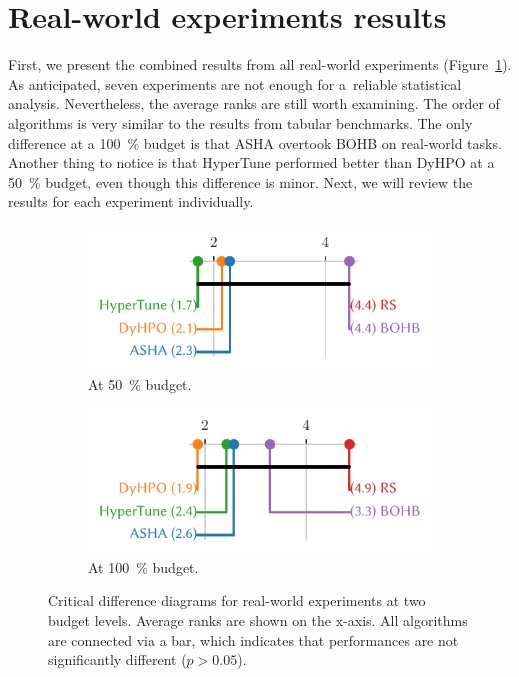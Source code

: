 \section{Real-world experiments results}

First, we present the combined results from all real-world experiments (Figure~\ref{fig:real_combined}). As anticipated, seven experiments are not enough for a~reliable statistical analysis. Nevertheless, the average ranks are still worth examining. The order of algorithms is very similar to the results from tabular benchmarks. The only difference at a \SI{100}{\percent} budget is that ASHA overtook BOHB on real-world tasks. Another thing to notice is that HyperTune performed better than DyHPO at a \SI{50}{\percent} budget, even though this difference is minor. Next, we will review the results for each experiment individually.


\begin{figure}[H]
    \begin{subfigure}{.5\textwidth}
        \includegraphics[width=.92\textwidth]{img/real_exp/cd_diagram_real_half.pdf}%
        \caption{At \SI{50}{\percent} budget.}%
    \end{subfigure}%
    \begin{subfigure}{.5\textwidth}
        \includegraphics[width=.92\textwidth]{img/real_exp/cd_diagram_real.pdf}%
        \caption{At \SI{100}{\percent} budget.}%
    \end{subfigure}%
\caption{Critical difference diagrams for real-world experiments at two budget levels. Average ranks are shown on the x-axis. All algorithms are connected via a bar, which indicates that performances are not significantly different ($p>0.05$).}
\label{fig:real_combined}
\end{figure}

